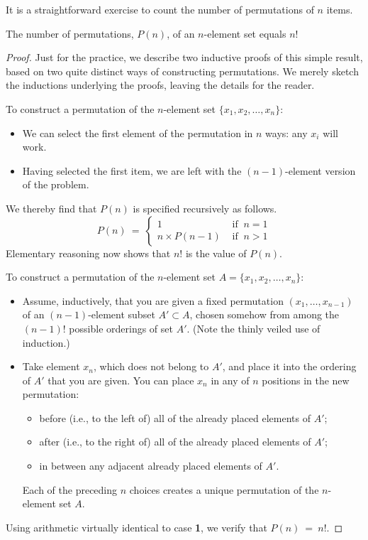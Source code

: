 \medskip

It is a straightforward exercise to count the number of permutations of $n$ items.

\begin{prop}
\label{thm:no-permutation}
The number of permutations, $P(n)$, of an $n$-element set equals $n!$
\end{prop}

\begin{proof}
Just for the practice, we describe two inductive proofs of this simple result, based on two quite distinct ways of constructing permutations.  We merely sketch the inductions underlying the proofs, leaving the details for the reader.

\medskip

To construct a permutation of the $n$-element set $\{ x_1, x_2, \ldots , x_n\}$:
\begin{itemize}
\item
We can select the first element of the permutation in $n$ ways: any $x_i$ will work.
\medskip\item
Having selected the first item, we are left with the $(n-1)$-element version of the problem.
\end{itemize}
We thereby find that $P(n)$ is specified recursively as follows.
\[
P(n) \ = \ \left\{
\begin{array}{cl}
1 & \mbox{ if } \ n=1 \\
n \times P(n-1) & \mbox{ if } \ n>1
\end{array}
\right.
\]
Elementary reasoning now shows that $n!$ is the value of $P(n)$.

\bigskip

To construct a permutation of the $n$-element set $A = \{ x_1, x_2, \ldots , x_n\}$:
\begin{itemize}
\item
Assume, inductively, that you are given a fixed  permutation $(x_1, \ldots , x_{n-1})$ of an $(n-1)$-element subset $A'  \subset A$, chosen somehow from among the $(n-1)!$ possible orderings of set $A'$.  (Note the thinly veiled use of induction.)
\medskip\item
Take element $x_n$, which does not belong to $A'$, and place it into the ordering of $A'$ that you are given.  You can place $x_n$ in any of $n$ positions in the new permutation:
  \begin{itemize}
  \item
before (i.e., to the left of) all of the already placed elements of $A'$;
  \medskip\item
after (i.e., to the right of) all of the already placed elements of $A'$;
  \medskip\item
in between any adjacent already placed elements of $A'$.
  \end{itemize}
Each of the preceding $n$ choices creates a unique permutation of the $n$-element set $A$.
\end{itemize}
Using arithmetic virtually identical to case {\bf 1}, we verify that $P(n) \ = \ n!$.


\end{proof}
